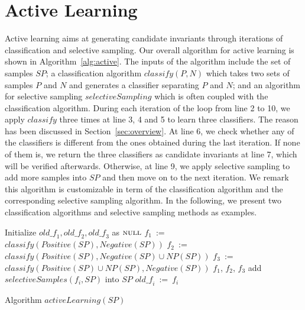 
\section{Active Learning} %
\label{sec:learning}
Active learning aims at generating candidate invariants through iterations of classification and selective sampling. Our overall algorithm for active learning is shown in Algorithm~\ref{alg:active}. The inputs of the algorithm include the set of samples $\mathit{SP}$; a classification algorithm $\mathit{classify}(P,N)$ which takes two sets of samples $P$ and $N$ and generates a classifier separating $P$ and $N$; and an algorithm for selective sampling $\mathit{selectiveSampling}$ which is often coupled with the classification algorithm. During each iteration of the loop from line 2 to 10, we apply $\mathit{classify}$ three times at line 3, 4 and 5 to learn three classifiers. The reason has been discussed in Section~\ref{sec:overview}. At line 6, we check whether any of the classifiers is different from the ones obtained during the last iteration. If none of them is, we return the three classifiers as candidate invariants at line 7, which will be verified afterwards. Otherwise, at line 9, we apply selective sampling to add more samples into $\mathit{SP}$ and then move on to the next iteration. We remark this algorithm is customizable in term of the classification algorithm and the corresponding selective sampling algorithm. In the following, we present two classification algorithms and selective sampling methods as examples.

\begin{algorithm}[t]
\SetAlgoVlined
\Indm
\Indp
Initialize $\mathit{old\_f_1}, \mathit{old\_f_2}, \mathit{old\_f_3}$ as $\textsc{null}$\;
 {
    $f_1$\ := \ $\mathit{classify}(\mathit{Positive}(\mathit{SP}), \mathit{Negative}(\mathit{SP}))$\;
    $f_2$\ := \ $\mathit{classify}(\mathit{Positive}(\mathit{SP}), \mathit{Negative}(\mathit{SP}) \cup \mathit{NP}(\mathit{SP}))$\;
    $f_3$\ := \ $\mathit{classify}(\mathit{Positive}(\mathit{SP}) \cup \mathit{NP}(\mathit{SP}), \mathit{Negative}(\mathit{SP}))$\;
     {
        \Return $f_1$, $f_2$, $f_3$\;
    }
     {
        add $\mathit{selectiveSamples}(f_i, \mathit{SP})$ into $\mathit{SP}$\;
        $\mathit{old\_f_i}\ := \ f_i$\;
    }
}
\caption{Algorithm $\mathit{activeLearning}(\mathit{SP})$}
\label{alg:active}
\end{algorithm}


